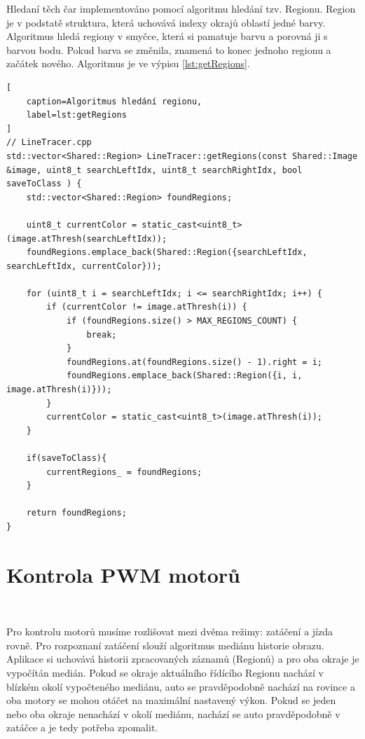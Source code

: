 Hledaní těch čar implementováno pomocí algoritmu hledání tzv. Regionu.
Region je v podstatě struktura, která uchovává indexy okrajů oblastí jedné barvy.
Algoritmus hledá regiony v smyčce, která si pamatuje barvu a porovná ji s barvou bodu.
Pokud barva se změnila, znamená to konec jednoho regionu a začátek nového.
Algoritmus je ve výpisu \ref{lst:getRegions}\cite{robot}.
\begin{lstlisting}[
	caption=Algoritmus hledání regionu,
	label=lst:getRegions
]
// LineTracer.cpp
std::vector<Shared::Region> LineTracer::getRegions(const Shared::Image &image, uint8_t searchLeftIdx, uint8_t searchRightIdx, bool saveToClass ) {
	std::vector<Shared::Region> foundRegions;

	uint8_t currentColor = static_cast<uint8_t>(image.atThresh(searchLeftIdx));
	foundRegions.emplace_back(Shared::Region({searchLeftIdx, searchLeftIdx, currentColor}));

	for (uint8_t i = searchLeftIdx; i <= searchRightIdx; i++) {
		if (currentColor != image.atThresh(i)) {
			if (foundRegions.size() > MAX_REGIONS_COUNT) {
				break;
			}
			foundRegions.at(foundRegions.size() - 1).right = i;
			foundRegions.emplace_back(Shared::Region({i, i, image.atThresh(i)}));
		}
		currentColor = static_cast<uint8_t>(image.atThresh(i));
	}

	if(saveToClass){
		currentRegions_ = foundRegions;
	}

	return foundRegions;
}
\end{lstlisting}

\section{Kontrola PWM motorů}\

Pro kontrolu motorů musíme rozlišovat mezi dvěma režimy: zatáčení a jízda rovně.
Pro rozpoznaní zatáčení slouží algoritmus mediánu historie obrazu.
Aplikace si uchovává historii zpracovaných záznamů (Regionů) a pro oba
okraje je vypočítán medián. Pokud se okraje aktuálního řídícího Regionu nachází
v blízkém okolí vypočteného mediánu, auto se pravděpodobně nachází na rovince a oba motory
se mohou otáčet na maximální nastavený výkon. Pokud se jeden nebo oba okraje nenachází
v okolí mediánu, nachází se auto pravděpodobně v zatáčce a je tedy potřeba zpomalit.

